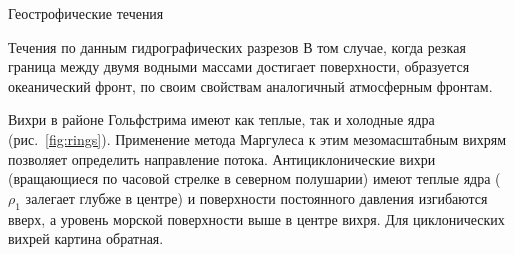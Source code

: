 \begin{chapter}{Геострофические течения}
\begin{section}{Течения по данным гидрографических разрезов}
В том случае, когда резкая граница между двумя водными массами
достигает поверхности, образуется океанический фронт, по своим
свойствам аналогичный атмосферным фронтам.
%

Вихри в районе Гольфстрима имеют как теплые, так и холодные ядра
(рис.~\ref{fig:rings}). Применение метода Маргулеса к этим 
мезомасштабным вихрям позволяет определить 
направление потока. Антициклонические вихри (вращающиеся по часовой стрелке 
в северном полушарии) имеют теплые ядра ($\rho_1$ залегает 
глубже в центре) и поверхности постоянного давления изгибаются вверх, 
а уровень морской поверхности выше в центре вихря. Для циклонических вихрей 
картина обратная.
%


\end{section}
\end{chapter}
